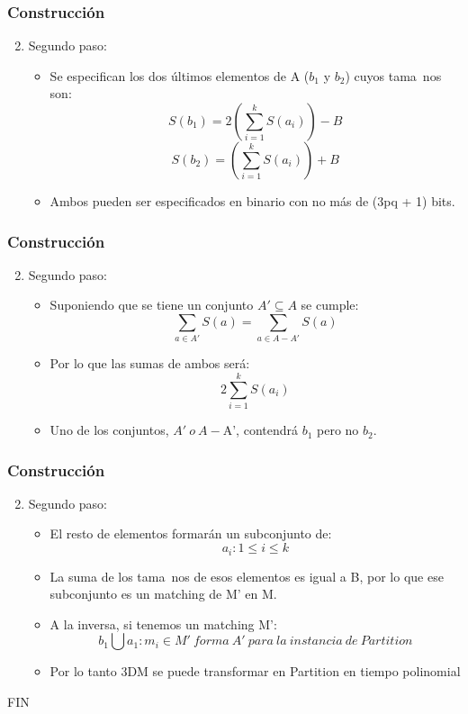 \documentclass{beamer}
\begin{document}

\begin{frame}
\frametitle{Construcci\'on}
\begin{enumerate}
\setcounter{enumi}{1}
\item Segundo paso:
\begin{itemize}
\item Se especifican los dos \'ultimos elementos de A ($b_{1}$ y $b_{2}$) cuyos tama~{n}os son:
$$S(b_{1}) = 2(\sum\limits_{i=1}^{k}S(a_{i})) - B $$
$$S(b_{2}) = (\sum\limits_{i=1}^{k}S(a_{i})) + B $$
\item Ambos pueden ser especificados en binario con no m\'as de (3pq + 1) bits.
\end{itemize}

\end{enumerate}

\end{frame}


\begin{frame}
\frametitle{Construcci\'on}
\begin{enumerate}
\setcounter{enumi}{1}
\item Segundo paso:
\begin{itemize}
\item Suponiendo que se tiene un conjunto $A' \subseteq A$ se cumple:
$$\sum\limits_{a \in A'} S(a) = \sum\limits_{a \in A - A'} S(a)$$
\item Por lo que las sumas de ambos ser\'a:
$$ 2\sum\limits_{i=1}^{k}S(a_{i})$$
\item Uno de los conjuntos, $A'\ o \ A - $A', contendr\'a $b_{1}$ pero no $b_{2}$.
\end{itemize}

\end{enumerate}

\end{frame}


\begin{frame}
\frametitle{Construcci\'on}
\begin{enumerate}
\setcounter{enumi}{1}
\item Segundo paso:
\begin{itemize}
\item El resto de elementos formar\'an un subconjunto de:
$$a_{i}: 1 \leq i \leq k$$
\item La suma de los tama~{n}os de esos elementos es igual a B, por lo que ese subconjunto es un matching de M' en M.
\item A la inversa, si tenemos un matching M':
$${b_{1} \bigcup {a_{1}}: m_{i} \in M' \ forma \ A' \ para \ la \ instancia \ de \ Partition } $$
\item Por lo tanto 3DM se puede transformar en Partition en tiempo polinomial
\end{itemize}

\end{enumerate}

\end{frame}


\begin{frame}
\Huge{\centerline{FIN}}
\end{frame}

\end{document}
